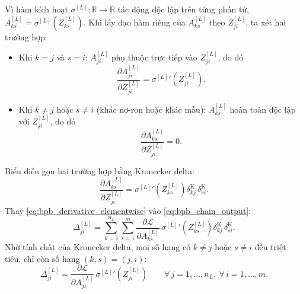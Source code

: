 Vì hàm kích hoạt $\sigma^{[L]}: \mathbb{R} \to \mathbb{R}$ tác động độc lập trên từng phần tử, $A_{ks}^{[L]} = \sigma^{[L]}\!\left(Z_{ks}^{[L]}\right)$. Khi lấy đạo hàm riêng của $A_{ks}^{[L]}$ theo $Z_{ji}^{[L]}$, ta xét hai trường hợp:
\begin{itemize}
    \item Khi $k = j$ và $s = i$: $A_{ji}^{[L]}$ phụ thuộc trực tiếp vào $Z_{ji}^{[L]}$, do đó
    \begin{equation}
    \frac{\partial A_{ji}^{[L]}}{\partial Z_{ji}^{[L]}} = {\sigma^{[L]}}'\!\left(Z_{ji}^{[L]}\right).
    \end{equation}
    \item Khi $k \neq j$ hoặc $s \neq i$ (khác nơ-ron hoặc khác mẫu): $A_{ks}^{[L]}$ hoàn toàn độc lập với $Z_{ji}^{[L]}$, do đó
    \begin{equation}
    \frac{\partial A_{ks}^{[L]}}{\partial Z_{ji}^{[L]}} = 0.
    \end{equation}
\end{itemize}
Biểu diễn gọn hai trường hợp bằng Kronecker delta:
\begin{equation}
\frac{\partial A_{ks}^{[L]}}{\partial Z_{ji}^{[L]}} = {\sigma^{[L]}}'\!\left(Z_{ks}^{[L]}\right)\delta^{\mathrm{K}}_{kj}\,\delta^{\mathrm{K}}_{si}.
\label{eq:bpb_derivative_elementwise}
\end{equation}
Thay \eqref{eq:bpb_derivative_elementwise} vào \eqref{eq:bpb_chain_output}:
\begin{equation}
\Delta_{ji}^{[L]} = \sum_{k=1}^{n_L}\sum_{s=1}^{m} \frac{\partial\mathcal{L}}{\partial A_{ks}^{[L]}}\,{\sigma^{[L]}}'\!\left(Z_{ks}^{[L]}\right)\delta^{\mathrm{K}}_{kj}\,\delta^{\mathrm{K}}_{si}.
\end{equation}
Nhờ tính chất của Kronecker delta, mọi số hạng có $k \neq j$ hoặc $s \neq i$ đều triệt tiêu, chỉ còn số hạng $(k,s) = (j,i)$:
\begin{equation}
\Delta_{ji}^{[L]} = \frac{\partial\mathcal{L}}{\partial A_{ji}^{[L]}}\,{\sigma^{[L]}}'\!\left(Z_{ji}^{[L]}\right)
\qquad \forall\, j = 1,\dots,n_L,\ \forall\, i = 1,\dots,m.
\label{eq:bpb_scalar_output}
\end{equation}
 
